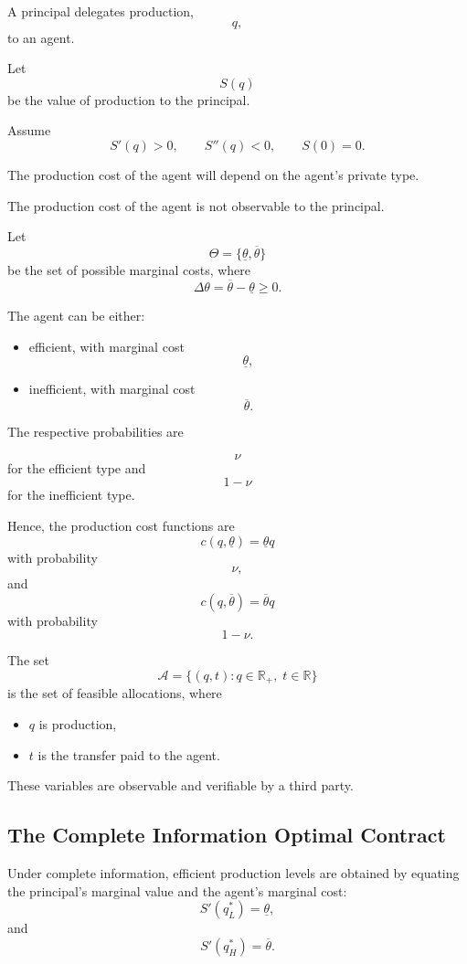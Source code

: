 A principal delegates production,
\[
q,
\]
to an agent.

Let
\[
S(q)
\]
be the value of production to the principal.

Assume
\[
S'(q)>0,
\qquad
S''(q)<0,
\qquad
S(0)=0.
\]

The production cost of the agent will depend on the agent's private type.




The production cost of the agent is not observable to the principal.

Let
\[
\Theta=\{\underline{\theta},\overline{\theta}\}
\]
be the set of possible marginal costs, where
\[
\Delta\theta
=
\overline{\theta}-\underline{\theta}
\ge 0.
\]

The agent can be either:

\begin{itemize}
    \item efficient, with marginal cost
    \[
    \underline{\theta},
    \]
    \item inefficient, with marginal cost
    \[
    \overline{\theta}.
    \]
\end{itemize}

The respective probabilities are

\[
\nu
\]
for the efficient type and
\[
1-\nu
\]
for the inefficient type.

Hence, the production cost functions are
\[
c(q,\underline{\theta})
=
\underline{\theta}q
\]
with probability
\[
\nu,
\]
and
\[
c(q,\overline{\theta})
=
\overline{\theta}q
\]
with probability
\[
1-\nu.
\]

The set
\[
\mathcal{A}
=
\{
(q,t)
:
q\in\mathbb{R}_+,
\;
t\in\mathbb{R}
\}
\]
is the set of feasible allocations, where

\begin{itemize}
    \item \(q\) is production,
    \item \(t\) is the transfer paid to the agent.
\end{itemize}

These variables are observable and verifiable by a third party.

\subsection{The Complete Information Optimal Contract}

Under complete information, efficient production levels are obtained by equating the principal's marginal value and the agent's marginal cost:
\[
S'(q^*_L)=\underline{\theta},
\]
and
\[
S'(q^*_H)=\overline{\theta}.
\]

